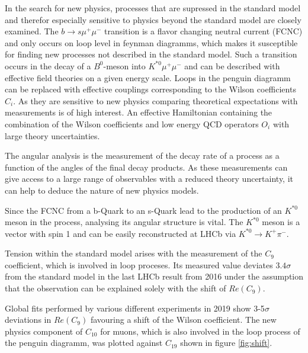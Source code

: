 \documentclass[%
 reprint,
 amsmath,amssymb,
 aps,
]{revtex4-2}
\begin{document}
In the search for new physics, processes that are supressed in the standard model and therefor especially sensitive to physics beyond the
standard model are closely examined. The $b \longrightarrow s\mu^+\mu^-$ transition is a flavor changing neutral current (FCNC) and only occurs on
loop level in feynman diagramms, which makes it susceptible for finding new processes not described in the standard model. Such a
transition occurs in the decay of a $B^0$-meson into $K^{*0}\mu^+\mu^-$ and can be described with effective field theories on a given energy scale.
Loops in the penguin diagramm can be replaced with effective couplings corresponding to the Wilson coefficients $C_i$. As they are sensitive to
new physics comparing theoretical expectations with measurements is of high interest. An effective Hamiltonian containing the
combination of the Wilson coefficients and low energy QCD operators $O_i$ with large theory uncertainties.

The angular analysis is the measurement of the decay rate of a process as a function of the angles of the final decay products. As these
measurements can give access to a large range of observables with a reduced theory uncertainty, it can help
to deduce the nature of new physics models.

Since the FCNC from a b-Quark to an s-Quark lead to the production of an $K^{*0}$ meson in the process, analysing its angular structure is
vital. The $K^{*0}$ meson is a vector with spin 1 and can be easily reconstructed at LHCb via $K^{*0} \longrightarrow K^+\pi^-$.

Tension within the standard model arises with the measurement of the $C_9$ coefficient, which is involved in loop proceses.
Its measured value deviates $3.4\sigma$ from the standard model in the last LHCb result from 2016
under the assumption that the observation can be explained solely with the shift of $Re(C_9)$.

Global fits performed by various different experiments in 2019 show 3-5$\sigma$ deviations in $Re(C_9)$ favouring a shift of the
Wilson coefficient. The new physics component of $C_{10}$ for muons, which is also involved in the loop process of the penguin diagramm, was
plotted against $C_19$ shown in figure \ref{fig:shift}.
\end{document}
